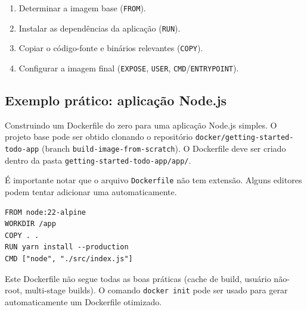 \begin{enumerate}
    \item Determinar a imagem base (\texttt{FROM}).
    \item Instalar as dependências da aplicação (\texttt{RUN}).
    \item Copiar o código-fonte e binários relevantes (\texttt{COPY}).
    \item Configurar a imagem final (\texttt{EXPOSE}, \texttt{USER}, \texttt{CMD}/\texttt{ENTRYPOINT}).
\end{enumerate}

\subsection{Exemplo prático: aplicação Node.js}

Construindo um Dockerfile do zero para uma aplicação Node.js simples. O projeto base pode ser obtido clonando o repositório \texttt{docker/getting-started-todo-app} (branch \texttt{build-image-from-scratch}). O Dockerfile deve ser criado dentro da pasta \texttt{getting-started-todo-app/app/}.

É importante notar que o arquivo \texttt{Dockerfile} não tem extensão. Alguns editores podem tentar adicionar uma automaticamente.

\begin{verbatim}
FROM node:22-alpine
WORKDIR /app
COPY . .
RUN yarn install --production
CMD ["node", "./src/index.js"]
\end{verbatim}

Este Dockerfile não segue todas as boas práticas (cache de build, usuário não-root, multi-stage builds). O comando \texttt{docker init} pode ser usado para gerar automaticamente um Dockerfile otimizado.
